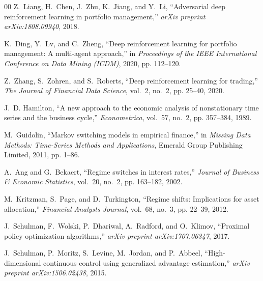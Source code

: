 \documentclass[conference]{IEEEtran}
\begin{document}
\begin{thebibliography}{00}
Z.~Liang, H.~Chen, J.~Zhu, K.~Jiang, and Y.~Li, ``Adversarial deep reinforcement learning in portfolio management,'' \emph{arXiv preprint arXiv:1808.09940}, 2018.

K.~Ding, Y.~Lv, and C.~Zheng, ``Deep reinforcement learning for portfolio management: A multi-agent approach,'' in \emph{Proceedings of the IEEE International Conference on Data Mining (ICDM)}, 2020, pp. 112--120.

Z.~Zhang, S.~Zohren, and S.~Roberts, ``Deep reinforcement learning for trading,'' \emph{The Journal of Financial Data Science}, vol.~2, no.~2, pp. 25--40, 2020.

J.~D. Hamilton, ``A new approach to the economic analysis of nonstationary time series and the business cycle,'' \emph{Econometrica}, vol.~57, no.~2, pp. 357--384, 1989.

M.~Guidolin, ``Markov switching models in empirical finance,'' in \emph{Missing Data Methods: Time-Series Methods and Applications}, Emerald Group Publishing Limited, 2011, pp. 1--86.

A.~Ang and G.~Bekaert, ``Regime switches in interest rates,'' \emph{Journal of Business \& Economic Statistics}, vol.~20, no.~2, pp. 163--182, 2002.

M.~Kritzman, S.~Page, and D.~Turkington, ``Regime shifts: Implications for asset allocation,'' \emph{Financial Analysts Journal}, vol.~68, no.~3, pp. 22--39, 2012.

J.~Schulman, F.~Wolski, P.~Dhariwal, A.~Radford, and O.~Klimov, ``Proximal policy optimization algorithms,'' \emph{arXiv preprint arXiv:1707.06347}, 2017.

J.~Schulman, P.~Moritz, S.~Levine, M.~Jordan, and P.~Abbeel, ``High-dimensional continuous control using generalized advantage estimation,'' \emph{arXiv preprint arXiv:1506.02438}, 2015.

\end{thebibliography}
\end{document}

